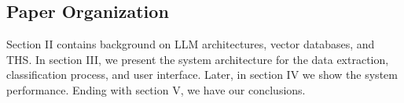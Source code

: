 \subsection{Paper Organization}
Section II contains background on LLM  architectures, vector databases, and THS. In section III, we present the system architecture for the data extraction, classification process, and user interface. Later, in section IV we show the system performance. Ending with section V, we have our conclusions.
